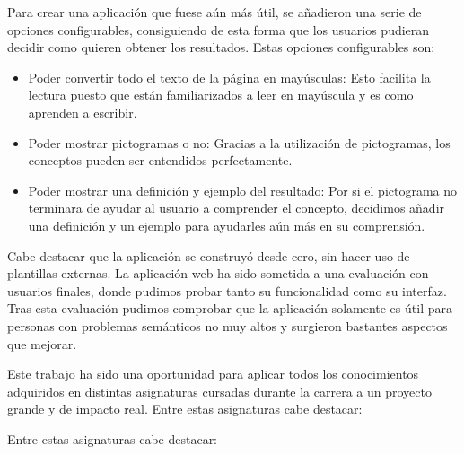 Para crear una aplicación que fuese aún más útil, se añadieron una serie de opciones configurables, consiguiendo de esta forma que los usuarios pudieran decidir como quieren obtener los resultados. Estas opciones configurables son: 
\begin{itemize}
	\item Poder convertir todo el texto de la página en mayúsculas: Esto facilita la lectura puesto que están familiarizados a leer en mayúscula y es como aprenden a escribir.
    \item Poder mostrar pictogramas o no: Gracias a la utilización de pictogramas, los conceptos pueden ser entendidos perfectamente.
    \item Poder mostrar una definición y ejemplo del resultado: Por si el pictograma no terminara de ayudar al usuario a comprender el concepto, decidimos añadir una definición y un ejemplo para ayudarles aún más en su comprensión.
\end{itemize}

	Cabe destacar que la aplicación se construyó desde cero, sin hacer uso de plantillas externas.
	La aplicación web ha sido sometida a una evaluación con usuarios finales, donde pudimos probar tanto su funcionalidad como su interfaz. Tras esta evaluación pudimos comprobar que la aplicación solamente es útil para personas con problemas semánticos no muy altos y surgieron bastantes aspectos que mejorar.
	
	 Este trabajo ha sido una oportunidad para aplicar todos los conocimientos adquiridos en distintas asignaturas cursadas durante la carrera a un proyecto grande y de impacto real.
	 Entre estas asignaturas cabe destacar:
	 
 	Entre estas asignaturas cabe destacar:
 	
